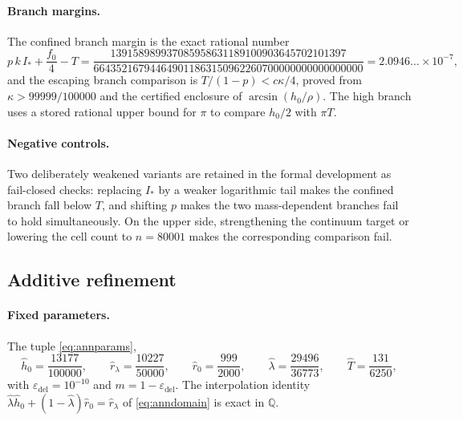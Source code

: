 \documentclass[11pt]{article}
\theoremstyle{plain}
\theoremstyle{definition}
\theoremstyle{remark}
\newcommand{\Q}{\mathbb{Q}}
\newcommand{\Istar}{I_{*}}
\newcommand{\epsdel}{\varepsilon_{\mathrm{del}}}
\begin{document}
\paragraph{Branch margins.} The confined branch margin is the exact rational
number
\[
  p\,k\,\Istar+\frac{f_{0}}{4}-T
  =\frac{139158989937085958631189100903645702101397}
         {664352167944649011863150962260700000000000000000}
  =2.0946\ldots\times10^{-7},
\]
and the escaping branch comparison is $T/(1-p)<c\kappa/4$, proved from
$\kappa>99999/100000$ and the certified enclosure of $\arcsin(h_{0}/\rho)$. The
high branch uses a stored rational upper bound for $\pi$ to compare $h_{0}/2$ with
$\pi T$.

\paragraph{Negative controls.} Two deliberately weakened variants are retained
in the formal development as fail-closed checks: replacing $\Istar$ by a weaker
logarithmic tail makes the confined branch fall below $T$, and shifting $p$
makes the two mass-dependent branches fail to hold simultaneously. On the upper
side, strengthening the continuum target or lowering the cell count to
$n=80001$ makes the corresponding comparison fail.

\subsection{Additive refinement}\label{app:annconstants}

\paragraph{Fixed parameters.} The tuple \eqref{eq:annparams},
\[
  \hat h_{0}=\frac{13177}{100000},
  \qquad
  \hat r_{\lambda}=\frac{10227}{50000},
  \qquad
  \hat r_{0}=\frac{999}{2000},
  \qquad
  \hat\lambda=\frac{29496}{36773},
  \qquad
  \hat T=\frac{131}{6250},
\]
with $\epsdel=10^{-10}$ and $m=1-\epsdel$. The interpolation identity
$\hat\lambda\hat h_{0}+(1-\hat\lambda)\hat r_{0}=\hat r_{\lambda}$ of
\eqref{eq:anndomain} is exact in $\Q$.
\end{document}
